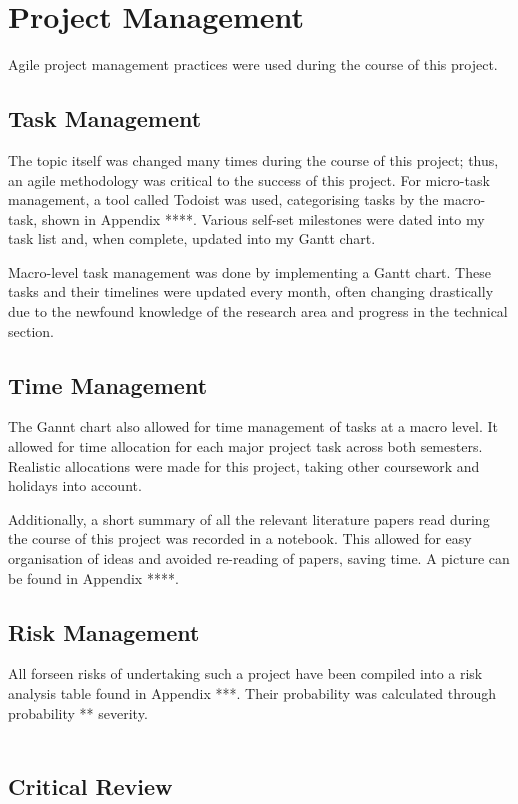 

\section {Project Management}

Agile project management practices were used during the course of this project. 

\subsection{Task Management}

The topic itself was changed many times during the course of this project; thus, an agile methodology was critical to the success of this project. For micro-task management, a tool called Todoist was used, categorising tasks by the macro-task, shown in Appendix ****. Various self-set milestones were dated into my task list and, when complete, updated into my Gantt chart.

Macro-level task management was done by implementing a Gantt chart. These tasks and their timelines were updated every month, often changing drastically due to the newfound knowledge of the research area and progress in the technical section. 

\subsection{Time Management}

The Gannt chart also allowed for time management of tasks at a macro level. It allowed for time allocation for each major project task across both semesters. Realistic allocations were made for this project, taking other coursework and holidays into account. 

Additionally, a short summary of all the relevant literature papers read during the course of this project was recorded in a notebook. This allowed for easy organisation of ideas and avoided re-reading of papers, saving time. A picture can be found in Appendix ****.

\subsection{Risk Management}

All forseen risks of undertaking such a project have been compiled into a risk analysis table found in Appendix ***. Their probability was calculated through probability ** severity.\\\

\subsection{Critical Review}


